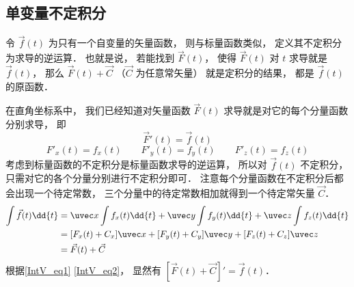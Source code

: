 

\subsection{单变量不定积分}
令 $\vec f(t)$ 为只有一个自变量的矢量函数， 则与标量函数类似， 定义其不定积分为求导的逆运算． 也就是说， 若能找到 $\vec F(t)$， 使得 $\vec F(t)$ 对 $t$ 求导就是 $\vec f(t)$， 那么 $\vec F(t) + \vec C$ （$\vec C$ 为任意常矢量） 就是定积分的结果， 都是 $\vec f(t)$ 的原函数．

在直角坐标系中， 我们已经知道对矢量函数 $\vec F(t)$ 求导就是对它的每个分量函数分别求导， 即
\begin{equation}\label{IntV_eq1}
\vec F'(t) = \vec f(t)
\end{equation}
\begin{equation}\label{IntV_eq2}
F'_x(t) = f_x(t) \qquad F'_y(t) = f_y(t) \qquad F'_z(t) = f_z(t)
\end{equation}
考虑到标量函数的不定积分是标量函数求导的逆运算， 所以对 $\vec f(t)$ 不定积分， 只需对它的各个分量分别进行不定积分即可． 注意每个分量函数在不定积分后都会出现一个待定常数， 三个分量中的待定常数相加就得到一个待定常矢量 $\vec C$．
\begin{equation}\begin{aligned}
\int \vec f(t) \dd{t} &= \uvec x \int f_x(t) \dd{t} + \uvec y \int f_y(t) \dd{t} + \uvec z \int f_z(t) \dd{t}\\
&= [F_x(t)+C_x]\uvec x + [F_y(t)+C_y]\uvec y + [F_z(t)+C_z]\uvec z\\
&= \vec F(t) + \vec C
\end{aligned}\end{equation}
根据\autoref{IntV_eq1} \autoref{IntV_eq2}， 显然有 $[\vec F(t) + \vec C]' = \vec f(t)$．

